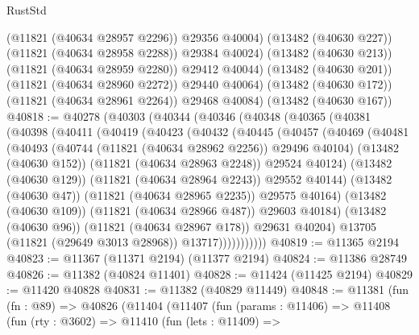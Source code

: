 \begin{lexlean}{RustStd}
\begin{coremodule}
              (@11821 (@40634 @28957 @2296))
              @29356
              @40004)
            (@13482 (@40630 @227))
            (@11821 (@40634 @28958 @2288))
            @29384
            @40024)
          (@13482 (@40630 @213))
          (@11821 (@40634 @28959 @2280))
          @29412
          @40044)
        (@13482 (@40630 @201))
        (@11821 (@40634 @28960 @2272))
        @29440
        @40064)
      (@13482 (@40630 @172))
      (@11821 (@40634 @28961 @2264))
      @29468
      @40084)
    (@13482 (@40630 @167))
@40818 := @40278
    (@40303
      (@40344
        (@40346
          (@40348
            (@40365
              (@40381
                (@40398
                  (@40411
                    (@40419
                      (@40423
                        (@40432
                          (@40445
                            (@40457
                              (@40469
                                (@40481
                                  (@40493
                                    (@40744 (@11821 (@40634 @28962 @2256)) @29496 @40104)
                                    (@13482 (@40630 @152))
                                    (@11821 (@40634 @28963 @2248))
                                    @29524
                                    @40124)
                                  (@13482 (@40630 @129))
                                  (@11821 (@40634 @28964 @2243))
                                  @29552
                                  @40144)
                                (@13482 (@40630 @47))
                                (@11821 (@40634 @28965 @2235))
                                @29575
                                @40164)
                              (@13482 (@40630 @109))
                              (@11821 (@40634 @28966 @487))
                              @29603
                              @40184)
                            (@13482 (@40630 @96))
                            (@11821 (@40634 @28967 @178))
                            @29631
                            @40204)
                          @13705
                          (@11821 (@29649 @3013 @28968))
                          @13717)))))))))))
@40819 := @11365 @2194
@40823 := @11367 (@11371 @2194) (@11377 @2194)
@40824 := @11386 @28749
@40826 := @11382 (@40824 @11401)
@40828 := @11424 (@11425 @2194)
@40829 := @11420 @40828
@40831 := @11382 (@40829 @11449)
@40848 := @11381
    (fun (fn : @89) =>
    @40826
      (@11404
        (@11407
          (fun (params : @11406) =>
          @11408
            (fun (rty : @3602) =>
            @11410
              (fun (lets : @11409) =>

\end{coremodule}
\end{lexlean}
